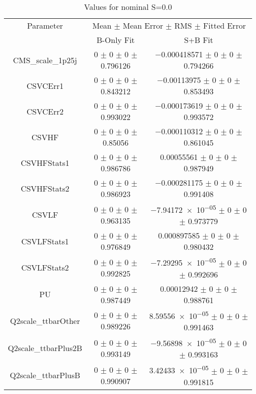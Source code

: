 \begin{table}
\centering
\caption{Values for nominal S=0.0}
\begin{tabular}{ccc}
\toprule
Parameter & \multicolumn{2}{c}{Mean $\pm$ Mean Error $\pm$ RMS $\pm$ Fitted Error}\\
 & B-Only Fit & S+B Fit\\
\midrule
CMS\_scale\_1p25j & \num{0} $\pm$ \num{0} $\pm$ \num{0} $\pm$ \num{0.796126} & \num{-0.000418571} $\pm$ \num{0} $\pm$ \num{0} $\pm$ \num{0.794266}\\
CSVCErr1 & \num{0} $\pm$ \num{0} $\pm$ \num{0} $\pm$ \num{0.843212} & \num{-0.00113975} $\pm$ \num{0} $\pm$ \num{0} $\pm$ \num{0.853493}\\
CSVCErr2 & \num{0} $\pm$ \num{0} $\pm$ \num{0} $\pm$ \num{0.993022} & \num{-0.000173619} $\pm$ \num{0} $\pm$ \num{0} $\pm$ \num{0.993572}\\
CSVHF & \num{0} $\pm$ \num{0} $\pm$ \num{0} $\pm$ \num{0.85056} & \num{-0.000110312} $\pm$ \num{0} $\pm$ \num{0} $\pm$ \num{0.861045}\\
CSVHFStats1 & \num{0} $\pm$ \num{0} $\pm$ \num{0} $\pm$ \num{0.986786} & \num{0.00055561} $\pm$ \num{0} $\pm$ \num{0} $\pm$ \num{0.987949}\\
CSVHFStats2 & \num{0} $\pm$ \num{0} $\pm$ \num{0} $\pm$ \num{0.986923} & \num{-0.000281175} $\pm$ \num{0} $\pm$ \num{0} $\pm$ \num{0.991408}\\
CSVLF & \num{0} $\pm$ \num{0} $\pm$ \num{0} $\pm$ \num{0.963135} & \num{-7.94172e-05} $\pm$ \num{0} $\pm$ \num{0} $\pm$ \num{0.973779}\\
CSVLFStats1 & \num{0} $\pm$ \num{0} $\pm$ \num{0} $\pm$ \num{0.976849} & \num{0.000897585} $\pm$ \num{0} $\pm$ \num{0} $\pm$ \num{0.980432}\\
CSVLFStats2 & \num{0} $\pm$ \num{0} $\pm$ \num{0} $\pm$ \num{0.992825} & \num{-7.29295e-05} $\pm$ \num{0} $\pm$ \num{0} $\pm$ \num{0.992696}\\
PU & \num{0} $\pm$ \num{0} $\pm$ \num{0} $\pm$ \num{0.987449} & \num{0.00012942} $\pm$ \num{0} $\pm$ \num{0} $\pm$ \num{0.988761}\\
Q2scale\_ttbarOther & \num{0} $\pm$ \num{0} $\pm$ \num{0} $\pm$ \num{0.989226} & \num{8.59556e-05} $\pm$ \num{0} $\pm$ \num{0} $\pm$ \num{0.991463}\\
Q2scale\_ttbarPlus2B & \num{0} $\pm$ \num{0} $\pm$ \num{0} $\pm$ \num{0.993149} & \num{-9.56898e-05} $\pm$ \num{0} $\pm$ \num{0} $\pm$ \num{0.993163}\\
Q2scale\_ttbarPlusB & \num{0} $\pm$ \num{0} $\pm$ \num{0} $\pm$ \num{0.990907} & \num{3.42433e-05} $\pm$ \num{0} $\pm$ \num{0} $\pm$ \num{0.991815}\\

\end{tabular}
\end{table}
